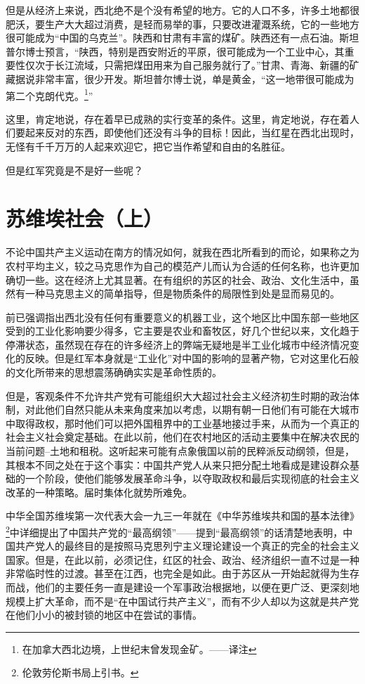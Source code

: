 \documentclass[10pt]{book}
\begin{document}
但是从经济上来说，西北绝不是个没有希望的地方。它的人口不多，许多土地都很肥沃，要生产大大超过消费，是轻而易举的事，只要改进灌溉系统，它的一些地方很可能成为“中国的乌克兰”。陕西和甘肃有丰富的煤矿。陕西还有一点石油。斯坦普尔博士预言，“陕西，特别是西安附近的平原，很可能成为一个工业中心，其重要性仅次于长江流域，只需把煤田用来为自己服务就行了。”甘肃、青海、新疆的矿藏据说非常丰富，很少开发。斯坦普尔博士说，单是黄金，“这一地带很可能成为第二个克朗代克。\footnote{在加拿大西北边境，上世纪末曾发现金矿。——译注}”

这里，肯定地说，存在着早已成熟的实行变革的条件。这里，肯定地说，存在着人们要起来反对的东西，即使他们还没有斗争的目标！因此，当红星在西北出现时，无怪有千千万万的人起来欢迎它，把它当作希望和自由的名胜征。

但是红军究竟是不是好一些呢？



\section{苏维埃社会（上）}

不论中国共产主义运动在南方的情况如何，就我在西北所看到的而论，如果称之为农村平均主义，较之马克思作为自己的模范产儿而认为合适的任何名称，也许更加确切一些。这在经济上尤其显著。在有组织的苏区的社会、政治、文化生活中，虽然有一种马克思主义的简单指导，但是物质条件的局限性到处是显而易见的。

前已强调指出西北没有任何有重要意义的机器工业，这个地区比中国东部一些地区受到的工业化影响要少得多，它主要是农业和畜牧区，好几个世纪以来，文化趋于停滞状态，虽然现在存在的许多经济上的弊端无疑地是半工业化城市中经济情况变化的反映。但是红军本身就是“工业化”对中国的影响的显著产物，它对这里化石般的文化所带来的思想震荡确确实实是革命性质的。

但是，客观条件不允许共产党有可能组织大大超过社会主义经济初生时期的政治体制，对此他们自然只能从未来角度来加以考虑，以期有朝一日他们有可能在大城市中取得政权，那时他们可以把外国租界中的工业基地接过手来，从而为一个真正的社会主义社会奠定基础。在此以前，他们在农村地区的活动主要集中在解决农民的当前问题--土地和租税。这听起来可能有点象俄国以前的民粹派反动纲领，但是，其根本不同之处在于这个事实：中国共产党人从来只把分配土地看成是建设群众基础的一个阶段，使他们能够发展革命斗争，以夺取政权和最后实现彻底的社会主义改革的一种策略。届时集体化就势所难免。

中华全国苏维埃第一次代表大会一九三一年就在《中华苏维埃共和国的基本法律》\footnote{伦敦劳伦斯书局上引书。}中详细提出了中国共产党的“最高纲领”——提到“最高纲领”的话清楚地表明，中国共产党人的最终目的是按照马克思列宁主义理论建设一个真正的完全的社会主义国家。但是，在此以前，必须记住，红区的社会、政治、经济组织一直不过是一种非常临时性的过渡。甚至在江西，也完全是如此。由于苏区从一开始起就得为生存而战，他们的主要任务一直是建设一个军事政治根据地，以便在更广泛、更深刻地规模上扩大革命，而不是“在中国试行共产主义”，而有不少人却以为这就是共产党在他们小小的被封锁的地区中在尝试的事情。
\end{document}

